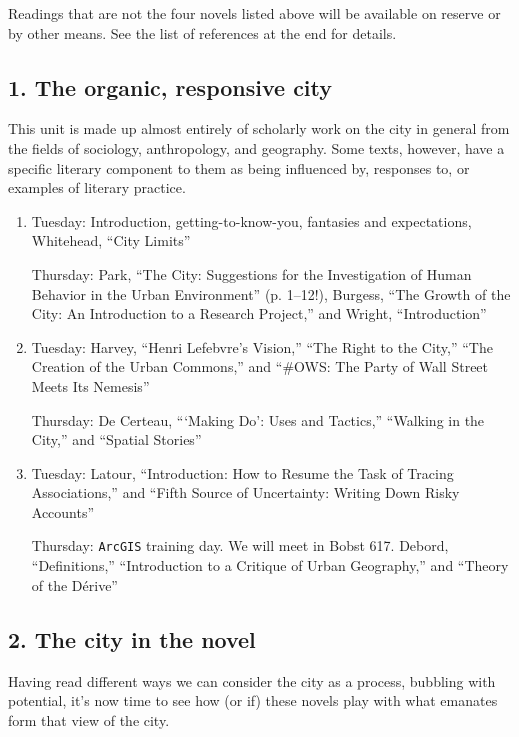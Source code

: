 Readings that are not the four novels listed above will be available on reserve
or by other means. See the list of references at the end for details.

\subsection*{1. The organic, responsive city}

  This unit is made up almost entirely of scholarly work on the city in general
  from the fields of sociology, anthropology, and geography. Some texts,
  however, have a specific literary component to them as being influenced by,
  responses to, or examples of literary practice. 

\begin{enumerate}

  \item Tuesday: Introduction, getting-to-know-you, fantasies and expectations,
    Whitehead, “City Limits”

    Thursday: Park, “The City: Suggestions for the Investigation of Human Behavior in the Urban Environment” (p. 1--12!), Burgess, “The Growth of the City: An Introduction to a Research Project,” and Wright, “Introduction”

  \item Tuesday: Harvey, “Henri Lefebvre’s Vision,” “The Right to the City,” “The Creation of the Urban Commons,” and “\#OWS: The Party of Wall Street Meets Its Nemesis”

    Thursday: De Certeau, “‘Making Do’: Uses and Tactics,” “Walking in the City,” and “Spatial Stories”

  \item Tuesday: Latour, “Introduction: How to Resume the Task of Tracing Associations,” and “Fifth Source of Uncertainty: Writing Down Risky Accounts”

    Thursday: \texttt{ArcGIS} training day. We will meet in Bobst 617. Debord, “Definitions,” “Introduction to a Critique of Urban Geography,” and “Theory of the Dérive”

\end{enumerate}

\subsection*{2. The city in the novel}

Having read different ways we can consider the city as a process, bubbling with
potential, it’s now time to see how (or if) these novels play with what
emanates form that view of the city.

